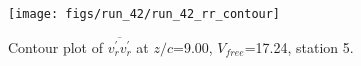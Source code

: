 \begin{figure}[H]
\centering
\texttt{[image: figs/run\_42/run\_42\_rr\_contour]}
\caption{Contour plot of $\overline{v_{r}^{\prime} v_{r}^{\prime}}$ at $z/c$=9.00, $V_{free}$=17.24, station 5.}
\label{fig:run_42_rr_contour}
\end{figure}


